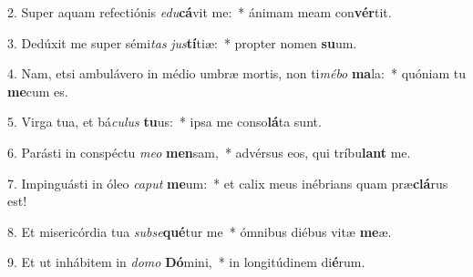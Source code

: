 2. Super aquam refectiónis \textit{e}\textit{du}\textbf{cá}vit me:~*  ánimam meam con\textbf{vér}tit.\

3. Dedúxit me super sémi\textit{tas} \textit{jus}\textbf{tí}tiæ:~*  propter nomen \textbf{su}um.\

4. Nam, etsi ambulávero in médio umbræ mortis, non ti\textit{mé}\textit{bo} \textbf{ma}la:~*  quóniam tu \textbf{me}cum es.\

5. Virga tua, et bá\textit{cu}\textit{lus} \textbf{tu}us:~*  ipsa me conso\textbf{lá}ta sunt.\

6. Parásti in conspéctu \textit{me}\textit{o} \textbf{men}sam,~*  advérsus eos, qui tríbu\textbf{lant} me.\

7. Impinguásti in óleo \textit{ca}\textit{put} \textbf{me}um:~*  et calix meus inébrians quam præ\textbf{clá}rus est!\

8. Et misericórdia tua \textit{sub}\textit{se}\textbf{qué}tur me~*  ómnibus diébus vitæ \textbf{me}æ.\

9. Et ut inhábitem in \textit{do}\textit{mo} \textbf{Dó}mini,~*  in longitúdinem di\textbf{é}rum.\

